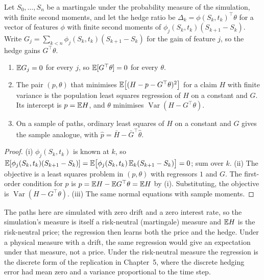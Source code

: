 \begin{chapterrefs}
\begin{proposition}\label{prop12:qhedge}
Let $S_0,\dots,S_n$ be a martingale under the probability measure of the simulation, with finite second moments, and let the hedge ratio be $\Delta_k=\phi(S_k,t_k)^\top\theta$ for a
vector of features $\phi$ with finite second moments of $\phi_j(S_k,t_k)(S_{k+1}-S_k)$. Write
$G_j=\sum_{k<n}\phi_j(S_k,t_k)(S_{k+1}-S_k)$ for the gain of feature $j$, so the hedge gains $G^\top\theta$.
\begin{enumerate}[label=(\roman*)]
\item $\mathbb{E} G_j=0$ for every $j$, so $\mathbb{E}[G^\top\theta]=0$ for every $\theta$.
\item The pair $(p,\theta)$ that minimises $\mathbb{E}\bigl[(H-p-G^\top\theta)^2\bigr]$ for a claim $H$ with finite variance
is the population least squares regression of $H$ on a constant and $G$. Its intercept is $p=\mathbb{E} H$, and $\theta$
minimises $\operatorname{Var}(H-G^\top\theta)$.
\item On a sample of paths, ordinary least squares of $H$ on a constant and $G$ gives the sample analogue,
with $\hat p=\bar H-\bar G^\top\hat\theta$.
\end{enumerate}
\end{proposition}

\begin{proof}
(i) $\phi_j(S_k,t_k)$ is known at $k$, so $\mathbb{E}[\phi_j(S_k,t_k)(S_{k+1}-S_k)]=\mathbb{E}\bigl[\phi_j(S_k,t_k)\,\mathbb{E}_k(S_{k+1}-S_k)\bigr]=0$;
sum over $k$. (ii) The objective is a least squares problem in $(p,\theta)$ with regressors $1$ and $G$. The
first-order condition for $p$ is $p=\mathbb{E} H-\mathbb{E} G^\top\theta=\mathbb{E} H$ by (i). Substituting, the objective is
$\operatorname{Var}(H-G^\top\theta)$. (iii) The same normal equations with sample moments.
\end{proof}

The paths here are simulated with zero drift and a zero interest rate, so the simulation's measure is
itself a risk-neutral (martingale) measure and $\mathbb{E} H$ is the risk-neutral price; the regression then
learns both the price and the hedge. Under a physical measure with a drift, the same regression would
give an expectation under that measure, not a price. Under the risk-neutral measure the regression is the discrete form of the replication in Chapter~5, where the
discrete hedging error had mean zero and a variance proportional to the time step.


\end{chapterrefs}
